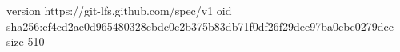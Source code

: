 version https://git-lfs.github.com/spec/v1
oid sha256:cf4cd2ae0d965480328cbdc0c2b375b83db71f0df26f29dee97ba0cbc0279dcc
size 510
